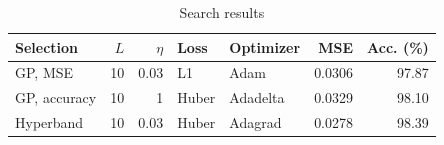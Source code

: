 \begin{table}[htbp]
\centering
\caption{Search results}
\label{tab:search}
\small
\begin{tabular}{lrrllrr}
\toprule
Selection & $L$ & $\eta$ & Loss & Optimizer & MSE & Acc. (\%) \\
\midrule
GP, MSE & 10 & 0.03 & L1 & Adam & 0.0306 & 97.87 \\
GP, accuracy & 10 & 1 & Huber & Adadelta & 0.0329 & 98.10 \\
Hyperband & 10 & 0.03 & Huber & Adagrad & 0.0278 & 98.39 \\
\bottomrule
\end{tabular}
\end{table}
